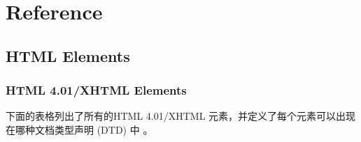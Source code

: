 \part{Reference}


\chapter{HTML Elements}



\section{HTML 4.01/XHTML Elements}



下面的表格列出了所有的HTML 4.01/XHTML 元素，并定义了每个元素可以出现在哪种文档类型声明 (DTD) 中 。


